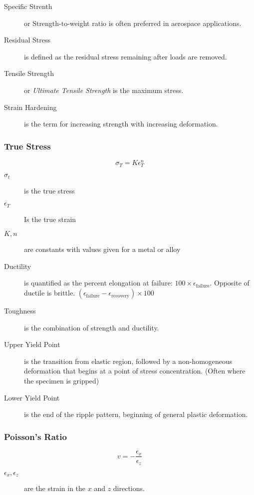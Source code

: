 \documentclass[10pt,letterpaper]{article}
\begin{document}
	\begin{description}
		\item[Specific Strenth] or Strength-to-weight ratio is often preferred in aerospace applications.
		\item[Residual Stress] is defined as the residual stress remaining after loads are removed. 
		\item[Tensile Strength] or \textit{Ultimate Tensile Strength} is the maximum stress. 
		\item[Strain Hardening] is the term for increasing strength with increasing deformation. 
	\end{description}
	
	\subsubsection*{True Stress}
	$$
	\sigma_T = K\epsilon^n_T
	$$
	\begin{description}
		\item[$\sigma_t$] is the true stress
		\item[$\epsilon_T$] Is the true strain
		\item[$K,n$] are constants with values given for a metal or alloy
	\end{description}
	
	\begin{description}
		\item[Ductility] is quantified as the percent elongation at failure: $100 \times \epsilon_{\text{failure}}$. Opposite of ductile is brittle. $(\epsilon_\text{failure} - \epsilon_{\text{recovery}}) \times 100$
		\item[Toughness] is the combination of strength and ductility. 
		\item[Upper Yield Point] is the transition from elastic region, followed by a non-homogeneous deformation that begins at a point of stress concentration. (Often where the specimen is gripped)
		\item[Lower Yield Point] is the end of the ripple pattern, beginning of general plastic deformation. 
	\end{description}
	
	\subsubsection*{Poisson's Ratio}
	$$
	v = - \frac{\epsilon_x}{\epsilon_z}
	$$
	\begin{description}
		\item[$\epsilon_x,\epsilon_z$] are the strain in the $x$ and $z$ directions. 
	\end{description}
	
\end{document}
